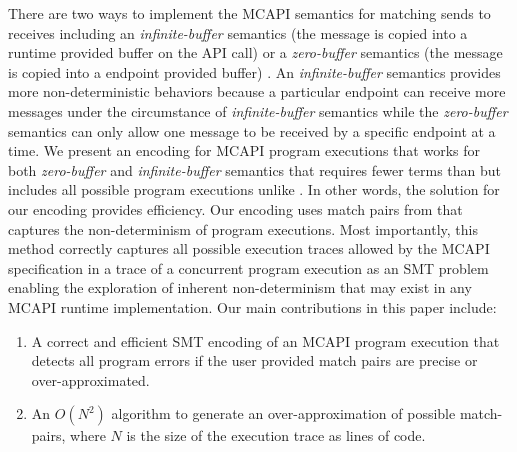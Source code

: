 There are two ways to implement the MCAPI semantics for matching sends to receives including an \textit{infinite-buffer} semantics (the message is copied into a runtime provided buffer on the API call) or a \textit{zero-buffer} semantics (the message is copied into a endpoint provided buffer) \cite{sarvani:fm09}.  An \textit{infinite-buffer} semantics provides more non-deterministic behaviors because a particular endpoint can receive more messages under the circumstance of \textit{infinite-buffer} semantics while the \textit{zero-buffer} semantics can only allow one message to be received by a specific endpoint at a time. We present an encoding for MCAPI program executions that works for both \textit{zero-buffer} and \textit{infinite-buffer} semantics that requires fewer terms than \cite{elwakil:padtad10} but includes all possible program executions unlike \cite{elwakil:padtad10}.  In other words, the solution for our encoding provides efficiency. Our encoding uses match pairs from \cite{sharma:fmcad09} that captures the non-determinism of program executions. Most importantly, this method correctly captures all possible execution traces allowed by the MCAPI specification in a trace of a concurrent program execution as an SMT problem enabling the exploration of inherent non-determinism that may exist in any MCAPI runtime implementation.
Our main contributions in this paper include:

\begin{enumerate}
\item  A correct and efficient SMT encoding of an MCAPI program execution that  detects all program errors if the user provided match pairs are precise or over-approximated.
\item  An $O(N^2)$ algorithm to generate an over-approximation of possible match-pairs, where $N$ is the size of the execution trace as lines of code.
\end{enumerate}

